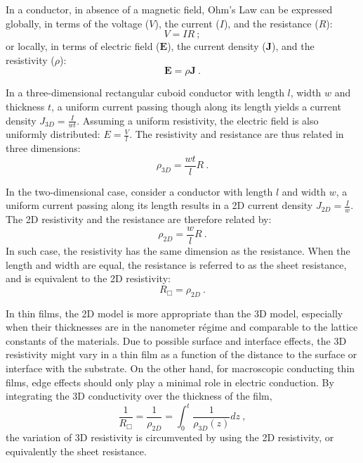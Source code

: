 In a conductor, in absence of a magnetic field, Ohm's Law can be expressed globally, in terms of the voltage ($V$), the current ($I$), and the resistance ($R$):%
\begin{equation}%
    V = I R~;%
\end{equation}%
or locally, in terms of electric field ($\mathbf{E}$), the current density ($\mathbf{J}$), and the resistivity ($\rho$):%
\begin{equation}%
    \mathbf{E} = \rho \mathbf{J}~.%
\end{equation}%

In a three-dimensional rectangular cuboid conductor with length $l$, width $w$ and thickness $t$, a uniform current passing though along its length yields a current density $J_{3D} = \frac{I}{wt}$. Assuming a uniform resistivity, the electric field is also uniformly distributed: $E = \frac{V}{l}$. The resistivity and resistance are thus related in three dimensions:%
\begin{equation}%
    \rho_{3D} = \frac{wt}{l}R~.%
\end{equation}%

In the two-dimensional case, consider a conductor with length $l$ and width $w$, a uniform current passing along its length results in a 2D current density $J_{2D} = \frac{I}{w}$. The 2D resistivity and the resistance are therefore related by:%
\begin{equation}\label{eq:2D_rho}%
	\rho_{2D} = \frac{w}{l}R~.%
\end{equation}%
In such case, the resistivity has the same dimension as the resistance. When the length and width are equal, the resistance is referred to as the sheet resistance, and is equivalent to the 2D resistivity:%
\begin{equation}%
	R_{\Box} = \rho_{2D}~.%
\end{equation}

In thin films, the 2D model is more appropriate than the 3D model, especially when their thicknesses are in the nanometer r\'egime and comparable to the lattice constants of the materials. Due to possible surface and interface effects, the 3D resistivity might vary in a thin film as a function of the distance to the surface or interface with the substrate. On the other hand, for macroscopic conducting thin films, edge effects should only play a minimal role in electric conduction. By integrating the 3D conductivity over the thickness of the film,%
\begin{equation}%
	\frac{1}{R_\Box} = \frac{1}{\rho_{2D}} = \int_0^t\frac{1}{\rho_{3D}(z)}dz~,%
\end{equation}%
the variation of 3D resistivity is circumvented by using the 2D resistivity, or equivalently the sheet resistance.

